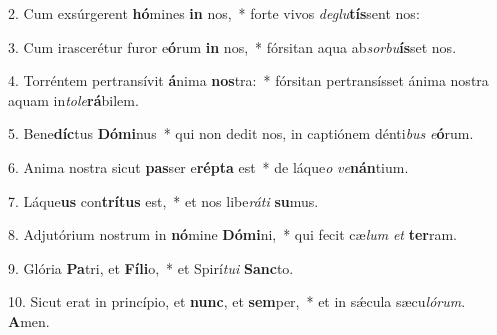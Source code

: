 2. Cum exsúrgerent \textbf{hó}mines \textbf{in} nos,~*  forte vivos \textit{de}\textit{glu}\textbf{tís}sent nos:\

3. Cum irascerétur furor e\textbf{ó}rum \textbf{in} nos,~*  fórsitan aqua ab\textit{sor}\textit{bu}\textbf{ís}set nos.\

4. Torréntem pertransívit \textbf{á}nima \textbf{nos}tra:~*  fórsitan pertransísset ánima nostra aquam in\textit{to}\textit{le}\textbf{rá}bilem.\

5. Bene\textbf{díc}tus \textbf{Dó}\textbf{mi}nus~*  qui non dedit nos, in captiónem dénti\textit{bus} \textit{e}\textbf{ó}rum.\

6. Anima nostra sicut \textbf{pas}ser e\textbf{rép}\textbf{ta} est~*  de láque\textit{o} \textit{ve}\textbf{nán}tium.\

7. Láque\textbf{us} con\textbf{trí}\textbf{tus} est,~*  et nos libe\textit{rá}\textit{ti} \textbf{su}mus.\

8. Adjutórium nostrum in \textbf{nó}mine \textbf{Dó}\textbf{mi}ni,~*  qui fecit cæ\textit{lum} \textit{et} \textbf{ter}ram.\

9. Glória \textbf{Pa}tri, et \textbf{Fí}\textbf{li}o,~*  et Spirí\textit{tu}\textit{i} \textbf{Sanc}to.\

10. Sicut erat in princípio, et \textbf{nunc}, et \textbf{sem}per,~*  et in sǽcula sæcu\textit{ló}\textit{rum}. \textbf{A}men.\

